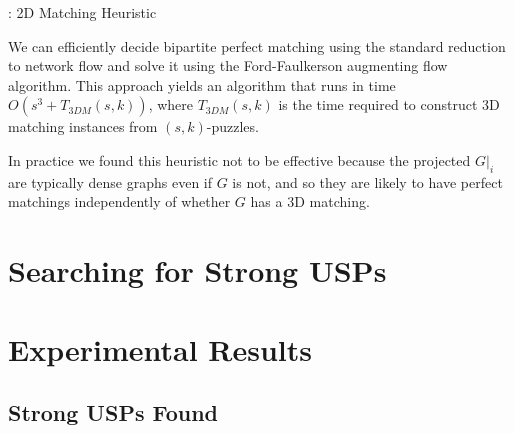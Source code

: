 \documentclass[11pt]{article}
\begin{document}
\begin{algorithm}
  \caption{: 2D Matching Heuristic}
  \label{alg:2dm}
\begin{algorithmic}[1]

  \Else
  \EndIf
\end{algorithmic}
\end{algorithm}

We can efficiently decide bipartite perfect matching using the
standard reduction to network flow and solve it using the
Ford-Faulkerson augmenting flow algorithm.  This approach yields an
algorithm that runs in time $O(s^3 + T_{3DM}(s,k))$, where
$T_{3DM}(s,k)$ is the time required to construct 3D matching instances
from $(s,k)$-puzzles.

In practice we found this heuristic not to be effective because the
projected $G|_i$ are typically dense graphs even if $G$ is not, and so
they are likely to have perfect matchings independently of whether $G$
has a 3D matching.







\section{Searching for Strong USPs}
\label{sec:search}

\section{Experimental Results}
\label{sec:results}

\subsection{Strong USPs Found}
\label{subsec:usps_found}
\end{document}
